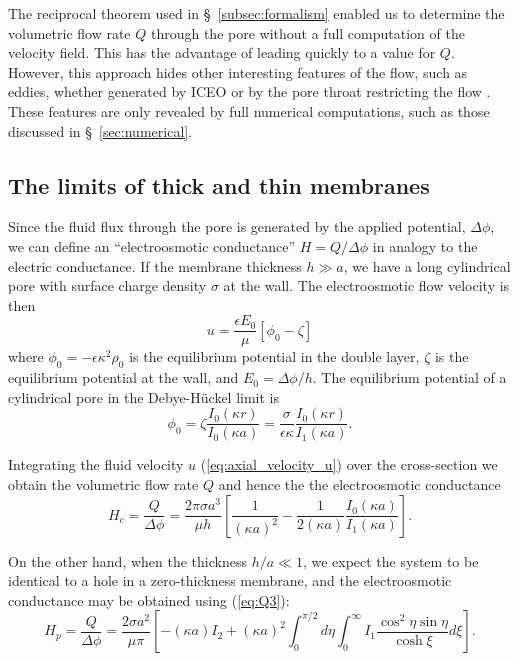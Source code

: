 The reciprocal theorem used in \S~\ref{subsec:formalism} enabled
us to determine the volumetric flow rate $Q$ through the pore without a full computation of the velocity field. This has the advantage of leading quickly to a value for $Q$. However, this approach hides other interesting features of the flow, such as eddies, whether generated by ICEO \cite{Thamida2002} or by the pore throat restricting the flow \cite{park2006eddies}. These features are only revealed by full numerical computations, such as those discussed in \S~\ref{sec:numerical}.

\subsection{The limits of thick and thin membranes} 
Since the fluid flux through the pore is generated by the applied potential, $\Delta \phi$,
we can define an ``electroosmotic conductance'' $H = Q/\Delta\phi$ in analogy to the electric conductance. If the membrane thickness  $h \gg a$, we have a long cylindrical pore with surface charge density $\sigma$ at the wall. 
The electroosmotic flow velocity is then \cite{levine1975}
\begin{equation}
u = \frac{\epsilon E_0}{\mu} [\phi_0 - \zeta]
\label{eq:axial_velocity_u}
\end{equation} 
where $\phi_0=-\epsilon\kappa^2\rho_0$ is the equilibrium potential in the double layer, $\zeta$ is the equilibrium potential at the wall, and $E_0 = \Delta\phi / h$. The equilibrium potential of a cylindrical pore in the Debye-H\"{u}ckel limit is
\begin{equation}
\phi_0 = \zeta \frac{I_0(\kappa r)}{I_0(\kappa a)}
= \frac{\sigma}{\epsilon\kappa} \frac{I_0(\kappa r)}{I_1(\kappa a)}.
\end{equation} 

Integrating the fluid velocity $u$ (\ref{eq:axial_velocity_u}) over the cross-section we obtain the volumetric flow rate $Q$ and hence the the electroosmotic conductance \cite{rice1965}
\begin{equation}
H_c = \frac{Q}{\Delta\phi} = \frac{2\pi\sigma a^3}{\mu h} \left[
\frac{1}{(\kappa a)^2} - \frac{1}{2(\kappa a)} \frac{I_0(\kappa
a)}{I_1(\kappa a)} \right].
\label{eq:Hc}
\end{equation}

On the other hand, when the thickness $h/a \ll  1$, we expect the system to be identical to a hole in a zero-thickness membrane, and the electroosmotic conductance may be obtained using (\ref{eq:Q3}):
\begin{equation}
H_p = \frac{Q}{\Delta\phi} =
\frac{2 \sigma a^2}{\mu\pi} \left[ - (\kappa a)
I_2 + (\kappa a)^2 \int_0^{\pi/2} d\eta \int_0^\infty I_1
\frac{\cos^2\eta\sin\eta}{\cosh\xi} d\xi \right].
\label{eq:Hp}
\end{equation} 

